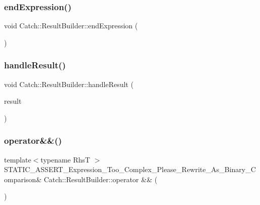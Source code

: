 \hypertarget{class_catch_1_1_result_builder_a75ac2dbabd8d4b4b3a75de9bbc3abf02}{}\label{class_catch_1_1_result_builder_a75ac2dbabd8d4b4b3a75de9bbc3abf02} 
\subsubsection{\texorpdfstring{end\+Expression()}{endExpression()}}
{\footnotesize\ttfamily void Catch\+::\+Result\+Builder\+::end\+Expression (\begin{DoxyParamCaption}{ }\end{DoxyParamCaption})}

\hypertarget{class_catch_1_1_result_builder_ad8bb17e4ac590b75bf8630d8f3502f4e}{}\label{class_catch_1_1_result_builder_ad8bb17e4ac590b75bf8630d8f3502f4e} 
\subsubsection{\texorpdfstring{handle\+Result()}{handleResult()}}
{\footnotesize\ttfamily void Catch\+::\+Result\+Builder\+::handle\+Result (\begin{DoxyParamCaption}\item[{\hyperlink{class_catch_1_1_assertion_result}{Assertion\+Result} const \&}]{result }\end{DoxyParamCaption})}

\hypertarget{class_catch_1_1_result_builder_ae92c6badf3f8e2ad4df66701a285f996}{}\label{class_catch_1_1_result_builder_ae92c6badf3f8e2ad4df66701a285f996} 
\subsubsection{\texorpdfstring{operator\&\&()}{operator\&\&()}}
{\footnotesize\ttfamily template$<$typename RhsT $>$ \\
S\+T\+A\+T\+I\+C\+\_\+\+A\+S\+S\+E\+R\+T\+\_\+\+Expression\+\_\+\+Too\+\_\+\+Complex\+\_\+\+Please\+\_\+\+Rewrite\+\_\+\+As\+\_\+\+Binary\+\_\+\+Comparison\& Catch\+::\+Result\+Builder\+::operator \&\& (\begin{DoxyParamCaption}\item[{RhsT const \&}]{ }\end{DoxyParamCaption})}

